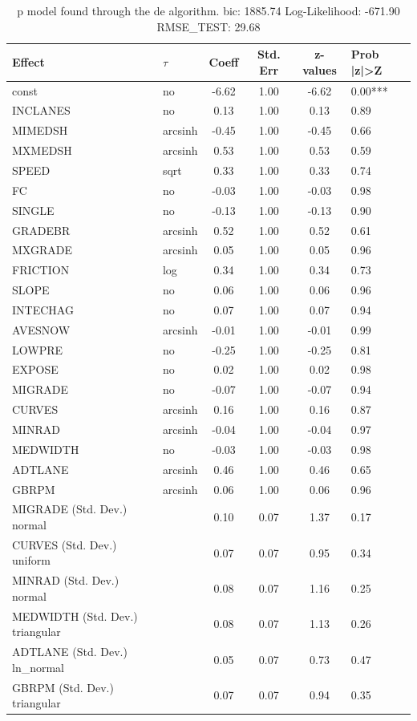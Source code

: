 \begin{table}
	\caption{p model found through the de algorithm. bic: 1885.74 Log-Likelihood: -671.90 RMSE_TEST: 29.68}
	\begin{center}
		\begin{tabular}{|l|l|c|c|c|l|}
			\hline
			Effect & $\tau$ & Coeff & Std. Err & z-values & Prob |z|>Z \\
			\hline
			const & no & -6.62 & 1.00 & -6.62 & 0.00*** \\
			\hline
			INCLANES & no & 0.13 & 1.00 & 0.13 & 0.89 \\
			\hline
			MIMEDSH & arcsinh & -0.45 & 1.00 & -0.45 & 0.66 \\
			\hline
			MXMEDSH & arcsinh & 0.53 & 1.00 & 0.53 & 0.59 \\
			\hline
			SPEED & sqrt & 0.33 & 1.00 & 0.33 & 0.74 \\
			\hline
			FC & no & -0.03 & 1.00 & -0.03 & 0.98 \\
			\hline
			SINGLE & no & -0.13 & 1.00 & -0.13 & 0.90 \\
			\hline
			GRADEBR & arcsinh & 0.52 & 1.00 & 0.52 & 0.61 \\
			\hline
			MXGRADE & arcsinh & 0.05 & 1.00 & 0.05 & 0.96 \\
			\hline
			FRICTION & log & 0.34 & 1.00 & 0.34 & 0.73 \\
			\hline
			SLOPE & no & 0.06 & 1.00 & 0.06 & 0.96 \\
			\hline
			INTECHAG & no & 0.07 & 1.00 & 0.07 & 0.94 \\
			\hline
			AVESNOW & arcsinh & -0.01 & 1.00 & -0.01 & 0.99 \\
			\hline
			LOWPRE & no & -0.25 & 1.00 & -0.25 & 0.81 \\
			\hline
			EXPOSE & no & 0.02 & 1.00 & 0.02 & 0.98 \\
			\hline
			MIGRADE & no & -0.07 & 1.00 & -0.07 & 0.94 \\
			\hline
			CURVES & arcsinh & 0.16 & 1.00 & 0.16 & 0.87 \\
			\hline
			MINRAD & arcsinh & -0.04 & 1.00 & -0.04 & 0.97 \\
			\hline
			MEDWIDTH & no & -0.03 & 1.00 & -0.03 & 0.98 \\
			\hline
			ADTLANE & arcsinh & 0.46 & 1.00 & 0.46 & 0.65 \\
			\hline
			GBRPM & arcsinh & 0.06 & 1.00 & 0.06 & 0.96 \\
			\hline
			MIGRADE (Std. Dev.) normal &  & 0.10 & 0.07 & 1.37 & 0.17 \\
			\hline
			CURVES (Std. Dev.) uniform &  & 0.07 & 0.07 & 0.95 & 0.34 \\
			\hline
			MINRAD (Std. Dev.) normal &  & 0.08 & 0.07 & 1.16 & 0.25 \\
			\hline
			MEDWIDTH (Std. Dev.) triangular &  & 0.08 & 0.07 & 1.13 & 0.26 \\
			\hline
			ADTLANE (Std. Dev.) ln_normal &  & 0.05 & 0.07 & 0.73 & 0.47 \\
			\hline
			GBRPM (Std. Dev.) triangular &  & 0.07 & 0.07 & 0.94 & 0.35 \\
			\hline
		\end{tabular}
	\end{center}
\end{table}